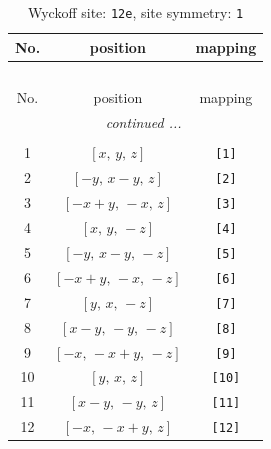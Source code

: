 \documentclass[fleqn,8pt]{jsarticle}
\begin{document}
\begin{longtable}{ccc}
\caption{Wyckoff site: {\tt 12e}, site symmetry: {\tt 1}}
 \\
 \hline \hline
No. & position & mapping \\ \hline \endfirsthead

\multicolumn{2}{l}{\tablename\ \thetable{}} \\
 \hline \hline
No. & position & mapping \\ \hline \endhead

 \hline \hline
\multicolumn{2}{r}{\footnotesize\it continued ...} \\ \endfoot

 \hline \hline
\multicolumn{2}{r}{} \\ \endlastfoot

1 & $\left[ x,\, y,\, z \right]$ & {\tt [1]} \\ \hline
2 & $\left[ - y,\, x - y,\, z \right]$ & {\tt [2]} \\ \hline
3 & $\left[ - x + y,\, - x,\, z \right]$ & {\tt [3]} \\ \hline
4 & $\left[ x,\, y,\, - z \right]$ & {\tt [4]} \\ \hline
5 & $\left[ - y,\, x - y,\, - z \right]$ & {\tt [5]} \\ \hline
6 & $\left[ - x + y,\, - x,\, - z \right]$ & {\tt [6]} \\ \hline
7 & $\left[ y,\, x,\, - z \right]$ & {\tt [7]} \\ \hline
8 & $\left[ x - y,\, - y,\, - z \right]$ & {\tt [8]} \\ \hline
9 & $\left[ - x,\, - x + y,\, - z \right]$ & {\tt [9]} \\ \hline
10 & $\left[ y,\, x,\, z \right]$ & {\tt [10]} \\ \hline
11 & $\left[ x - y,\, - y,\, z \right]$ & {\tt [11]} \\ \hline
12 & $\left[ - x,\, - x + y,\, z \right]$ & {\tt [12]} \\
\end{longtable}
\end{document}
